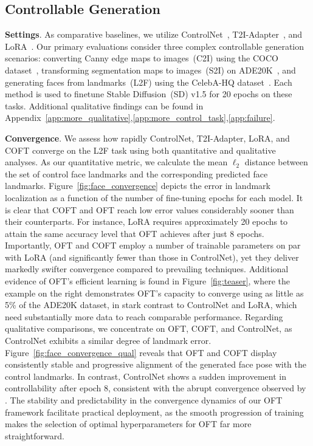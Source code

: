 \subsection{Controllable Generation}

\textbf{Settings}. As comparative baselines, we utilize ControlNet~\cite{zhang2023adding}, T2I-Adapter~\cite{mou2023t2i}, and LoRA~\cite{hulora2022}. Our primary evaluations consider three complex controllable generation scenarios: converting Canny edge maps to images~(C2I) using the COCO dataset~\cite{lin2014microsoft}, transforming segmentation maps to images~(S2I) on ADE20K~\cite{zhou2017scene}, and generating faces from landmarks~(L2F) using the CelebA-HQ dataset~\cite{karras2018progressive,xia2021tedigan}. Each method is used to finetune Stable Diffusion~(SD) v1.5 for 20 epochs on these tasks. Additional qualitative findings can be found in Appendix~\ref{app:more_qualitative},\ref{app:more_control_task},\ref{app:failure}.

\textbf{Convergence}. We assess how rapidly ControlNet, T2I-Adapter, LoRA, and COFT converge on the L2F task using both quantitative and qualitative analyses. As our quantitative metric, we calculate the mean $\ell_2$ distance between the set of control face landmarks and the corresponding predicted face landmarks. Figure~\ref{fig:face_convergence} depicts the error in landmark localization as a function of the number of fine-tuning epochs for each model. It is clear that COFT and OFT reach low error values considerably sooner than their counterparts. For instance, LoRA requires approximately 20 epochs to attain the same accuracy level that OFT achieves after just 8 epochs. Importantly, OFT and COFT employ a number of trainable parameters on par with LoRA (and significantly fewer than those in ControlNet), yet they deliver markedly swifter convergence compared to prevailing techniques. Additional evidence of OFT’s efficient learning is found in Figure~\ref{fig:teaser}, where the example on the right demonstrates OFT’s capacity to converge using as little as 5\% of the ADE20K dataset, in stark contrast to ControlNet and LoRA, which need substantially more data to reach comparable performance. Regarding qualitative comparisons, we concentrate on OFT, COFT, and ControlNet, as ControlNet exhibits a similar degree of landmark error. Figure~\ref{fig:face_convergence_qual} reveals that OFT and COFT display consistently stable and progressive alignment of the generated face pose with the control landmarks. In contrast, ControlNet shows a sudden improvement in controllability after epoch 8, consistent with the abrupt convergence observed by \cite{zhang2023adding}. The stability and predictability in the convergence dynamics of our OFT framework facilitate practical deployment, as the smooth progression of training makes the selection of optimal hyperparameters for OFT far more straightforward.

